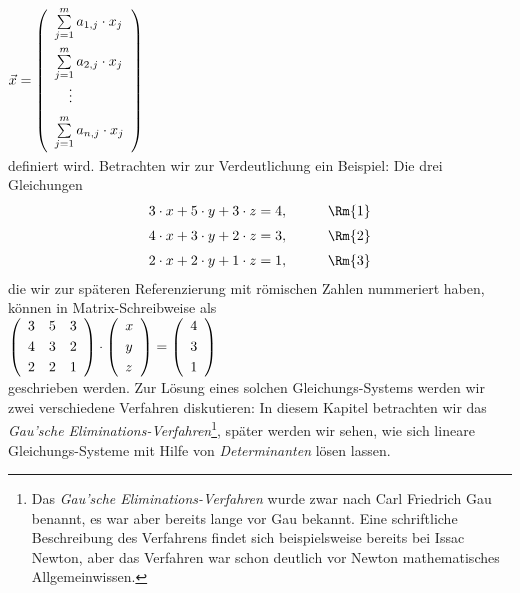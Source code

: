 \hspace*{1.3cm}
$\vec{x} = \left(
  \begin{array}[c]{l}
     \sum\limits_{j=1}^m a_{1,j} \cdot x_j    \\[0.4cm]
     \sum\limits_{j=1}^m a_{2,j} \cdot x_j    \\
     \quad\vdots                                   \\[0.2cm]
     \sum\limits_{j=1}^m a_{n,j} \cdot x_j    \\[0.4cm]
  \end{array}
 \right)
$ 
\\[0.2cm]
definiert wird.  Betrachten wir zur Verdeutlichung ein Beispiel:  Die drei Gleichungen
\begin{equation}
  \label{eq:gauss0} 
\begin{array}[c]{lllll}
  3 \cdot x + 5 \cdot y + 3 \cdot z = 4, & \quad & \Rm{1} \\[0.2cm]
  4 \cdot x + 3 \cdot y + 2 \cdot z = 3, & \quad & \Rm{2} \\[0.2cm]
  2 \cdot x + 2 \cdot y + 1 \cdot z = 1, & \quad & \Rm{3}
\end{array}
\end{equation}
die wir zur sp\"{a}teren Referenzierung mit r\"{o}mischen Zahlen nummeriert haben,
k\"{o}nnen in Matrix-Schreibweise als
\\[0.2cm]
\hspace*{1.3cm}
$
\left(
\begin{array}[c]{lll}
  3  & 5 & 3  \\[0.1cm]
  4  & 3 & 2  \\[0.1cm]
  2  & 2 & 1  
\end{array}
\right) \cdot \left(
  \begin{array}[c]{lll}
    x \\[0.1cm] y \\[0.1cm] z
  \end{array}
\right) = \left(
  \begin{array}[c]{lll}
    4 \\[0.1cm] 3 \\[0.1cm] 1
  \end{array}
\right)
$
\\[0.2cm]
geschrieben werden.  
Zur L\"{o}sung eines solchen Gleichungs-Systems
werden wir zwei verschiedene Verfahren diskutieren:  In diesem Kapitel betrachten wir das 
\emph{Gau\3'sche Eliminations-Verfahren}\footnote{
  Das \emph{Gau\3'sche Eliminations-Verfahren} wurde zwar nach Carl Friedrich Gau\3 benannt,
  es war aber bereits lange vor Gau\3 bekannt.  Eine schriftliche Beschreibung des Verfahrens  findet
  sich beispielsweise bereits bei Issac Newton, aber das Verfahren war schon deutlich vor Newton 
  mathematisches Allgemeinwissen.},
sp\"{a}ter werden wir sehen, wie sich lineare Gleichungs-Systeme mit Hilfe von
\emph{Determinanten} l\"{o}sen lassen.   

